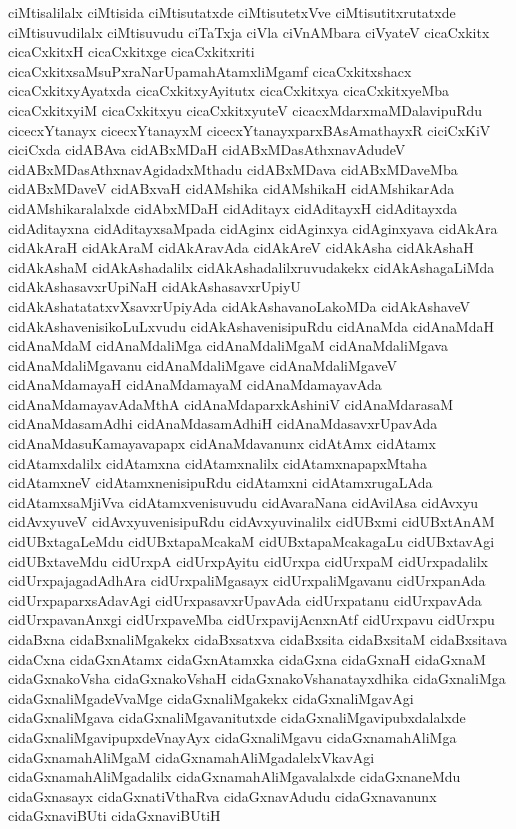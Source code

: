 {ciMtisalilalx
ciMtisida
ciMtisutatxde
ciMtisutetxVve
ciMtisutitxrutatxde
ciMtisuvudilalx
ciMtisuvudu
ciTaTxja
ciVla
ciVnAMbara
ciVyateV
cicaCxkitx
cicaCxkitxH
cicaCxkitxge
cicaCxkitxriti
cicaCxkitxsaMsuPxraNarUpamahAtamxliMgamf
cicaCxkitxshacx
cicaCxkitxyAyatxda
cicaCxkitxyAyitutx
cicaCxkitxya
cicaCxkitxyeMba
cicaCxkitxyiM
cicaCxkitxyu
cicaCxkitxyuteV
cicacxMdarxmaMDalavipuRdu
cicecxYtanayx
cicecxYtanayxM
cicecxYtanayxparxBAsAmathayxR
ciciCxKiV
ciciCxda
cidABAva
cidABxMDaH
cidABxMDasAthxnavAdudeV
cidABxMDasAthxnavAgidadxMthadu
cidABxMDava
cidABxMDaveMba
cidABxMDaveV
cidABxvaH
cidAMshika
cidAMshikaH
cidAMshikarAda
cidAMshikaralalxde
cidAbxMDaH
cidAditayx
cidAditayxH
cidAditayxda
cidAditayxna
cidAditayxsaMpada
cidAginx
cidAginxya
cidAginxyava
cidAkAra
cidAkAraH
cidAkAraM
cidAkAravAda
cidAkAreV
cidAkAsha
cidAkAshaH
cidAkAshaM
cidAkAshadalilx
cidAkAshadalilxruvudakekx
cidAkAshagaLiMda
cidAkAshasavxrUpiNaH
cidAkAshasavxrUpiyU
cidAkAshatatatxvXsavxrUpiyAda
cidAkAshavanoLakoMDa
cidAkAshaveV
cidAkAshavenisikoLuLxvudu
cidAkAshavenisipuRdu
cidAnaMda
cidAnaMdaH
cidAnaMdaM
cidAnaMdaliMga
cidAnaMdaliMgaM
cidAnaMdaliMgava
cidAnaMdaliMgavanu
cidAnaMdaliMgave
cidAnaMdaliMgaveV
cidAnaMdamayaH
cidAnaMdamayaM
cidAnaMdamayavAda
cidAnaMdamayavAdaMthA
cidAnaMdaparxkAshiniV
cidAnaMdarasaM
cidAnaMdasamAdhi
cidAnaMdasamAdhiH
cidAnaMdasavxrUpavAda
cidAnaMdasuKamayavapapx
cidAnaMdavanunx
cidAtAmx
cidAtamx
cidAtamxdalilx
cidAtamxna
cidAtamxnalilx
cidAtamxnapapxMtaha
cidAtamxneV
cidAtamxnenisipuRdu
cidAtamxni
cidAtamxrugaLAda
cidAtamxsaMjiVva
cidAtamxvenisuvudu
cidAvaraNana
cidAvilAsa
cidAvxyu
cidAvxyuveV
cidAvxyuvenisipuRdu
cidAvxyuvinalilx
cidUBxmi
cidUBxtAnAM
cidUBxtagaLeMdu
cidUBxtapaMcakaM
cidUBxtapaMcakagaLu
cidUBxtavAgi
cidUBxtaveMdu
cidUrxpA
cidUrxpAyitu
cidUrxpa
cidUrxpaM
cidUrxpadalilx
cidUrxpajagadAdhAra
cidUrxpaliMgasayx
cidUrxpaliMgavanu
cidUrxpanAda
cidUrxpaparxsAdavAgi
cidUrxpasavxrUpavAda
cidUrxpatanu
cidUrxpavAda
cidUrxpavanAnxgi
cidUrxpaveMba
cidUrxpavijAcnxnAtf
cidUrxpavu
cidUrxpu
cidaBxna
cidaBxnaliMgakekx
cidaBxsatxva
cidaBxsita
cidaBxsitaM
cidaBxsitava
cidaCxna
cidaGxnAtamx
cidaGxnAtamxka
cidaGxna
cidaGxnaH
cidaGxnaM
cidaGxnakoVsha
cidaGxnakoVshaH
cidaGxnakoVshanatayxdhika
cidaGxnaliMga
cidaGxnaliMgadeVvaMge
cidaGxnaliMgakekx
cidaGxnaliMgavAgi
cidaGxnaliMgava
cidaGxnaliMgavanitutxde
cidaGxnaliMgavipubxdalalxde
cidaGxnaliMgavipupxdeVnayAyx
cidaGxnaliMgavu
cidaGxnamahAliMga
cidaGxnamahAliMgaM
cidaGxnamahAliMgadalelxVkavAgi
cidaGxnamahAliMgadalilx
cidaGxnamahAliMgavalalxde
cidaGxnaneMdu
cidaGxnasayx
cidaGxnatiVthaRva
cidaGxnavAdudu
cidaGxnavanunx
cidaGxnaviBUti
cidaGxnaviBUtiH
}
